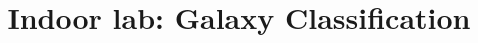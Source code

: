 \documentclass[11pt, preprint]{aastex}
\begin{document}
\title{\bf Indoor lab: Galaxy Classification}

~
\vspace{-30pt}


\end{document}
